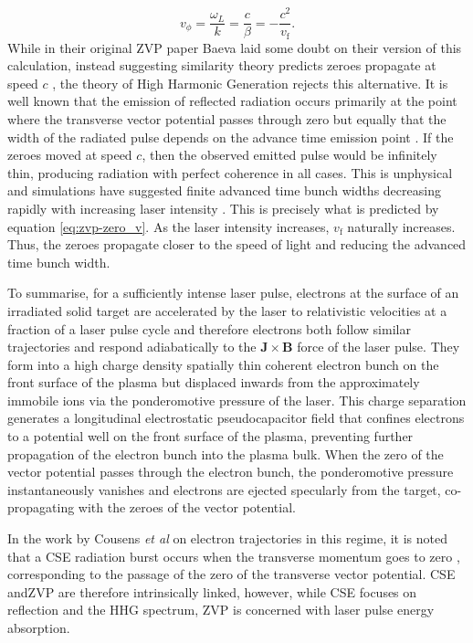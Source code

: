 \begin{equation}\label{eq:zvp-zero_v}
	v_\phi = \frac{\omega_L}{k} = \frac{c}{\beta} = -\frac{c^2}{v_\mathrm{f}}.
\end{equation}
While in their original ZVP paper Baeva laid some doubt on their version of this calculation, instead suggesting similarity theory predicts zeroes propagate at speed $c$ \cite{baevaZeroVectorPotential2011}, the theory of High Harmonic Generation rejects this alternative. It is well known that the emission of reflected radiation occurs primarily at the point where the transverse vector potential passes through zero \cite{cousensElectronTrajectoriesAssociated2020} but equally that the width of the radiated pulse depends on the advance time emission point \cite{edwardsXRayEmissionEffectiveness2020}. If the zeroes moved at speed $c$, then the observed emitted pulse would be infinitely thin, producing radiation with perfect coherence in all cases. This is unphysical and simulations have suggested finite advanced time bunch widths decreasing rapidly with increasing laser intensity \cite{edwardsXRayEmissionEffectiveness2020}. This is precisely what is predicted by equation \ref{eq:zvp-zero_v}. As the laser intensity increases, $v_\mathrm{f}$ naturally increases. Thus, the zeroes propagate closer to the speed of light and reducing the advanced time bunch width.

To summarise, for a sufficiently intense laser pulse, electrons at the surface of an irradiated solid target are accelerated by the laser to relativistic velocities at a fraction of a laser pulse cycle and therefore electrons both follow similar trajectories and respond adiabatically to the $\mathbf{J}\times \mathbf{B}$ force of the laser pulse. They form into a high charge density spatially thin coherent electron bunch on the front surface of the plasma but displaced inwards from the approximately immobile ions via the ponderomotive pressure of the laser. This charge separation generates a longitudinal electrostatic pseudocapacitor field that confines electrons to a potential well on the front surface of the plasma, preventing further propagation of the electron bunch into the plasma bulk. When the zero of the vector potential passes through the electron bunch, the ponderomotive pressure instantaneously vanishes and electrons are ejected specularly from the target, co-propagating with the zeroes of the vector potential.

In the work by Cousens \textit{et al} on electron trajectories in this regime, it is noted that a \ac{CSE} radiation burst occurs when the transverse momentum goes to zero \cite{cousens2020}, corresponding to the passage of the zero of the transverse vector potential. \ac{CSE} and\ac{ZVP} are therefore intrinsically linked, however, while CSE focuses on reflection and the \ac{HHG} spectrum, \ac{ZVP} is concerned with laser pulse energy absorption. 

